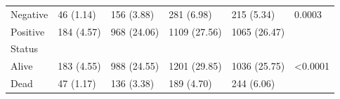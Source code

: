 \documentclass[times,sort&compress,3p]{elsarticle}
\theoremstyle{plain}
\theoremstyle{definition}
\begin{document}
\begin{table}[H]
\begin{tabular}{llllll}
Negative         & 46 (1.14)                                                    & 156 (3.88)   & 281 (6.98)   & 215 (5.34)   & 0.0003             \\
Positive         & 184 (4.57)                                                   & 968 (24.06)  & 1109 (27.56) & 1065 (26.47) &                    \\ \hline
Status           &                                                              &              &              &              &                    \\
Alive            & 183 (4.55)                                                   & 988 (24.55)  & 1201 (29.85) & 1036 (25.75) & \textless   0.0001 \\
Dead             & 47 (1.17)                                                    & 136 (3.38)   & 189 (4.70)   & 244 (6.06)   &                    \\ \hline
                

\end{tabular}
\end{table}
\end{document}
